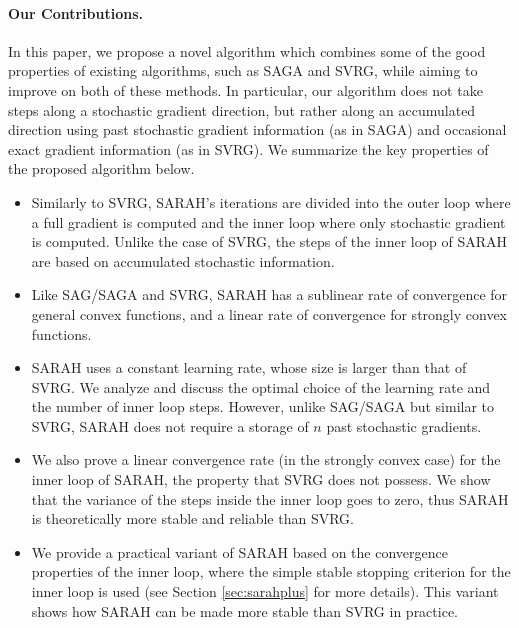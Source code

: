 \documentclass{article}
\begin{document}
\paragraph{Our Contributions.} In this paper, we propose a novel algorithm which  combines some of the good properties of existing algorithms, such as SAGA and SVRG, while aiming to improve on both of these methods. In particular, our algorithm does not take steps along a stochastic gradient direction, but rather along an accumulated direction using past stochastic gradient information (as in SAGA) and occasional exact gradient information (as in SVRG).  We summarize the key properties of the proposed algorithm below. 
\begin{itemize}[noitemsep,nolistsep]
\item Similarly to SVRG, SARAH's iterations are divided into the outer loop where a full gradient is computed and the inner loop where only stochastic gradient is computed.  Unlike the case of SVRG, the steps of the inner loop of SARAH are based on accumulated stochastic information. 
\item Like SAG/SAGA and SVRG, SARAH has a sublinear rate of convergence  for general convex functions, and a linear rate of convergence for strongly convex functions.
\item SARAH uses a constant learning rate, whose size is larger than that of SVRG.  We analyze and discuss the optimal choice of the learning rate and the number of inner loop steps. However, unlike SAG/SAGA but similar to SVRG, SARAH does not require a storage of $n$ past stochastic gradients.
\item We also prove a linear convergence rate (in the strongly convex case) for the inner loop of SARAH, the property that SVRG does not possess. We show that the variance of the steps inside the inner loop goes to zero, thus SARAH is theoretically more stable and reliable than SVRG.
\item We provide a practical variant of SARAH  based on the convergence properties of the inner loop, where the simple stable stopping criterion for the inner loop is used (see Section \ref{sec:sarahplus} for more details). This variant shows how SARAH can be made more stable than SVRG in practice. 
\end{itemize}

%
\end{document}

